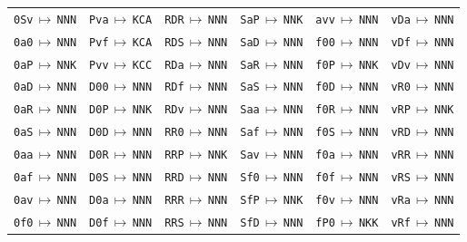 {\begin{longtable}{@{}llllll@{}}
\texttt{0Sv}\,$\mapsto$\,\texttt{NNN} & \texttt{Pva}\,$\mapsto$\,\texttt{KCA} & \texttt{RDR}\,$\mapsto$\,\texttt{NNN} & \texttt{SaP}\,$\mapsto$\,\texttt{NNK} & \texttt{avv}\,$\mapsto$\,\texttt{NNN} & \texttt{vDa}\,$\mapsto$\,\texttt{NNN} \\
\texttt{0a0}\,$\mapsto$\,\texttt{NNN} & \texttt{Pvf}\,$\mapsto$\,\texttt{KCA} & \texttt{RDS}\,$\mapsto$\,\texttt{NNN} & \texttt{SaD}\,$\mapsto$\,\texttt{NNN} & \texttt{f00}\,$\mapsto$\,\texttt{NNN} & \texttt{vDf}\,$\mapsto$\,\texttt{NNN} \\
\texttt{0aP}\,$\mapsto$\,\texttt{NNK} & \texttt{Pvv}\,$\mapsto$\,\texttt{KCC} & \texttt{RDa}\,$\mapsto$\,\texttt{NNN} & \texttt{SaR}\,$\mapsto$\,\texttt{NNN} & \texttt{f0P}\,$\mapsto$\,\texttt{NNK} & \texttt{vDv}\,$\mapsto$\,\texttt{NNN} \\
\texttt{0aD}\,$\mapsto$\,\texttt{NNN} & \texttt{D00}\,$\mapsto$\,\texttt{NNN} & \texttt{RDf}\,$\mapsto$\,\texttt{NNN} & \texttt{SaS}\,$\mapsto$\,\texttt{NNN} & \texttt{f0D}\,$\mapsto$\,\texttt{NNN} & \texttt{vR0}\,$\mapsto$\,\texttt{NNN} \\
\texttt{0aR}\,$\mapsto$\,\texttt{NNN} & \texttt{D0P}\,$\mapsto$\,\texttt{NNK} & \texttt{RDv}\,$\mapsto$\,\texttt{NNN} & \texttt{Saa}\,$\mapsto$\,\texttt{NNN} & \texttt{f0R}\,$\mapsto$\,\texttt{NNN} & \texttt{vRP}\,$\mapsto$\,\texttt{NNK} \\
\texttt{0aS}\,$\mapsto$\,\texttt{NNN} & \texttt{D0D}\,$\mapsto$\,\texttt{NNN} & \texttt{RR0}\,$\mapsto$\,\texttt{NNN} & \texttt{Saf}\,$\mapsto$\,\texttt{NNN} & \texttt{f0S}\,$\mapsto$\,\texttt{NNN} & \texttt{vRD}\,$\mapsto$\,\texttt{NNN} \\
\texttt{0aa}\,$\mapsto$\,\texttt{NNN} & \texttt{D0R}\,$\mapsto$\,\texttt{NNN} & \texttt{RRP}\,$\mapsto$\,\texttt{NNK} & \texttt{Sav}\,$\mapsto$\,\texttt{NNN} & \texttt{f0a}\,$\mapsto$\,\texttt{NNN} & \texttt{vRR}\,$\mapsto$\,\texttt{NNN} \\
\texttt{0af}\,$\mapsto$\,\texttt{NNN} & \texttt{D0S}\,$\mapsto$\,\texttt{NNN} & \texttt{RRD}\,$\mapsto$\,\texttt{NNN} & \texttt{Sf0}\,$\mapsto$\,\texttt{NNN} & \texttt{f0f}\,$\mapsto$\,\texttt{NNN} & \texttt{vRS}\,$\mapsto$\,\texttt{NNN} \\
\texttt{0av}\,$\mapsto$\,\texttt{NNN} & \texttt{D0a}\,$\mapsto$\,\texttt{NNN} & \texttt{RRR}\,$\mapsto$\,\texttt{NNN} & \texttt{SfP}\,$\mapsto$\,\texttt{NNK} & \texttt{f0v}\,$\mapsto$\,\texttt{NNN} & \texttt{vRa}\,$\mapsto$\,\texttt{NNN} \\
\texttt{0f0}\,$\mapsto$\,\texttt{NNN} & \texttt{D0f}\,$\mapsto$\,\texttt{NNN} & \texttt{RRS}\,$\mapsto$\,\texttt{NNN} & \texttt{SfD}\,$\mapsto$\,\texttt{NNN} & \texttt{fP0}\,$\mapsto$\,\texttt{NKK} & \texttt{vRf}\,$\mapsto$\,\texttt{NNN} \\

\end{longtable}}
